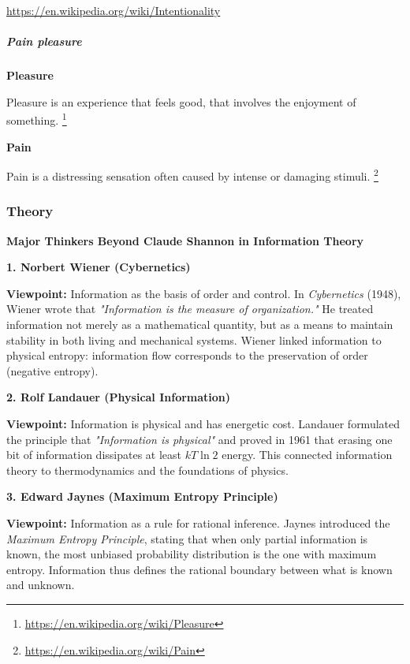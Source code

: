 \documentclass{book}
\providecommand{\ProjectDeepHeading}[2]{%
    \par\medskip\noindent\textbf{#2}\par\smallskip
}
\providecommand{\seeherefooter}[1]{\footnote{\url{#1}}}
\begin{document}
\url{https://en.wikipedia.org/wiki/Intentionality}

\subparagraph{Pain pleasure}


\ProjectDeepHeading{3}{Pleasure}
        Pleasure is an experience that feels good, that involves the enjoyment of something.
        \seeherefooter{https://en.wikipedia.org/wiki/Pleasure}
    
    
    \ProjectDeepHeading{3}{Pain}
        Pain is a distressing sensation often caused by intense or damaging stimuli.
        \seeherefooter{https://en.wikipedia.org/wiki/Pain}

\subsubsection{Theory}


\ProjectDeepHeading{1}{Major Thinkers Beyond Claude Shannon in Information Theory}
    
    \ProjectDeepHeading{2}{1. Norbert Wiener (Cybernetics)}
        \textbf{Viewpoint:} Information as the basis of order and control.
        In \textit{Cybernetics} (1948), Wiener wrote that
        \emph{"Information is the measure of organization."}
        He treated information not merely as a mathematical quantity, but as a means to maintain stability in both living and mechanical systems.
        Wiener linked information to physical entropy: information flow corresponds to the preservation of order (negative entropy).
    
    \ProjectDeepHeading{2}{2. Rolf Landauer (Physical Information)}
        \textbf{Viewpoint:} Information is physical and has energetic cost.
        Landauer formulated the principle that \emph{"Information is physical"} and proved in 1961 that erasing one bit of information dissipates at least $kT \ln 2$ energy.
        This connected information theory to thermodynamics and the foundations of physics.
    
    \ProjectDeepHeading{2}{3. Edward Jaynes (Maximum Entropy Principle)}
        \textbf{Viewpoint:} Information as a rule for rational inference.
        Jaynes introduced the \textit{Maximum Entropy Principle}, stating that when only partial information is known,
        the most unbiased probability distribution is the one with maximum entropy.
        Information thus defines the rational boundary between what is known and unknown.
    
\end{document}
